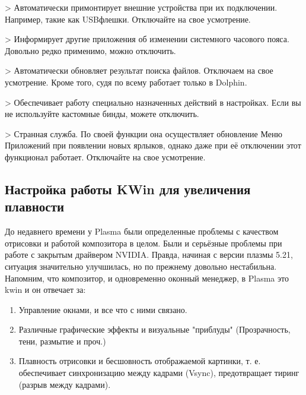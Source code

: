 \documentclass[letterpaper,10pt,russian,openany]{sphinxmanual}
\begin{document}
\sphinxAtStartPar
{} \sphinxhyphen{}> Автоматически примонтирует внешние устройства при их подключении.
Например, такие как USB\sphinxhyphen{}флешки. Отключайте на свое усмотрение.

\sphinxAtStartPar
{} \sphinxhyphen{}> Информирует другие приложения об изменении  системного часового пояса.
Довольно редко применимо, можно отключить.

\sphinxAtStartPar
{} \sphinxhyphen{}> Автоматически обновляет результат поиска файлов.
Отключаем на свое усмотрение. Кроме того, судя по всему работает только в Dolphin.

\sphinxAtStartPar
{} \sphinxhyphen{}> Обеспечивает работу специально назначенных действий в настройках.
Если вы не используйте кастомные бинды, можете отключить.

\sphinxAtStartPar
{} \sphinxhyphen{}> Странная служба.
По своей функции она осуществляет обновление Меню Приложений при появлении новых ярлыков,
однако даже при её отключении этот функционал работает.
Отключайте на свое усмотрение.

\ignorespaces 

\subsection{Настройка работы KWin для увеличения плавности}
\label{\detokenize{source/de-optimizations:kwin}}\label{\detokenize{source/de-optimizations:lowlatency-kwin}}\label{\detokenize{source/de-optimizations:index-13}}
\sphinxAtStartPar
До недавнего времени у Plasma были определенные проблемы с качеством отрисовки и работой композитора в целом.
Были и серьёзные проблемы при работе с закрытым драйвером NVIDIA. Правда, начиная с версии плазмы 5.21, ситуация значительно улучшилась,
но по прежнему довольно нестабильна.
Напомним, что композитор, и одновременно оконный менеджер, в Plasma это kwin \sphinxhyphen{} и он отвечает за:
\begin{enumerate}
%
\item {} 
\sphinxAtStartPar
Управление окнами, и все что с ними связано.

\item {} 
\sphinxAtStartPar
Различные графические эффекты и визуальные "приблуды" (Прозрачность, тени, размытие и проч.)

\item {} 
\sphinxAtStartPar
Плавность отрисовки и бесшовность отображаемой картинки, т. е. обеспечивает синхронизацию между кадрами (Vsync), предотвращает тиринг (разрыв между кадрами).

\end{enumerate}
\end{document}
